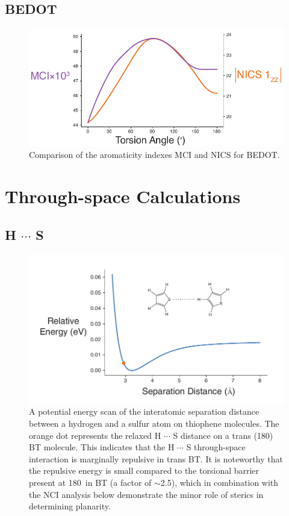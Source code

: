 \subsection{BEDOT}
\begin{figure}[hbt!]
    \centering
    \includegraphics{figures/append_aroma/pedot_aroma_compare_copy.pdf}
    \caption{Comparison of the aromaticity indexes MCI and NICS for BEDOT.}
    \label{fig:pedot_aroma_compare}
\end{figure}

\clearpage
\section{Through-space Calculations}\label{sec:aroma_ts}
\subsection{\texorpdfstring{H $\cdots$ S}{HS}}
\begin{figure}[hbt!]
    \centering
    \includegraphics{figures/append_aroma/ts_t_t_copy.pdf}
    \caption{A potential energy scan of the interatomic separation distance between a hydrogen and a sulfur atom on thiophene molecules. The orange dot represents the relaxed H $\cdots$ S distance on a trans (180\textdegree) BT molecule. This indicates that the H $\cdots$ S through-space interaction is marginally repulsive in trans BT. It is noteworthy that the repulsive energy is small compared to the torsional barrier present at 180\textdegree \ in BT (a factor of $\sim$2.5), which in combination with the NCI analysis below demonstrate the minor role of sterics in determining planarity.}
    \label{fig:ts_t_t}
\end{figure}
\clearpage

